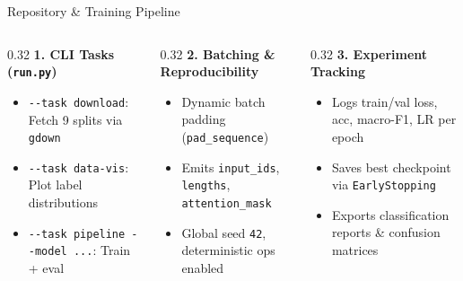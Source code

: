 \documentclass[aspectratio=169,10pt]{beamer}
\begin{document}
\begin{frame}{Repository \& Training Pipeline}
  \vspace{0.45cm}
  \begin{columns}[T,totalwidth=\textwidth]
    \begin{column}{0.32\textwidth}
      \textbf{1. CLI Tasks (\texttt{run.py})}
      \begin{itemize}\scriptsize
        \item \texttt{-{}-task download}: Fetch 9 splits via \texttt{gdown}
        \item \texttt{-{}-task data-vis}: Plot label distributions
        \item \texttt{-{}-task pipeline -{}-model ...}: Train + eval
      \end{itemize}
    \end{column}
    \begin{column}{0.32\textwidth}
      \textbf{2. Batching \& Reproducibility}
      \begin{itemize}\scriptsize
        \item Dynamic batch padding (\texttt{pad\_sequence})
        \item Emits \texttt{input\_ids}, \texttt{lengths}, \texttt{attention\_mask}
        \item Global seed \texttt{42}, deterministic ops enabled
      \end{itemize}
    \end{column}
    \begin{column}{0.32\textwidth}
      \textbf{3. Experiment Tracking}
      \begin{itemize}\scriptsize
        \item Logs train/val loss, acc, macro-F1, LR per epoch
        \item Saves best checkpoint via \texttt{EarlyStopping}
        \item Exports classification reports \& confusion matrices
      \end{itemize}
    \end{column}
  \end{columns}
\end{frame}
\end{document}
